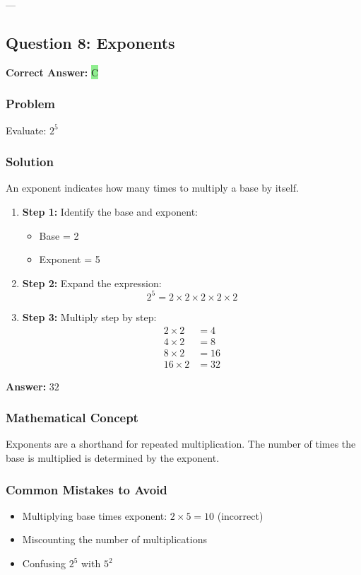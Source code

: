 \documentclass[12pt]{article}
\begin{document}
---

\subsection{Question 8: Exponents}

\textbf{Correct Answer: } \colorbox{lightgreen}{C}

\subsubsection*{Problem}
Evaluate: $2^5$

\subsubsection*{Solution}

An exponent indicates how many times to multiply a base by itself.

\begin{enumerate}
\item \textbf{Step 1:} Identify the base and exponent:
  \begin{itemize}
  \item Base = 2
  \item Exponent = 5
  \end{itemize}
\item \textbf{Step 2:} Expand the expression:
  \[
  2^5 = 2 \times 2 \times 2 \times 2 \times 2
  \]
\item \textbf{Step 3:} Multiply step by step:
  \begin{align*}
  2 \times 2 &= 4 \\
  4 \times 2 &= 8 \\
  8 \times 2 &= 16 \\
  16 \times 2 &= 32
  \end{align*}
\end{enumerate}

\textbf{Answer: } $32$

\subsubsection*{Mathematical Concept}
Exponents are a shorthand for repeated multiplication. The number of times the base is multiplied is determined by the exponent.

\subsubsection*{Common Mistakes to Avoid}
\begin{itemize}
\item Multiplying base times exponent: $2 \times 5 = 10$ (incorrect)
\item Miscounting the number of multiplications
\item Confusing $2^5$ with $5^2$
\end{itemize}
\end{document}

